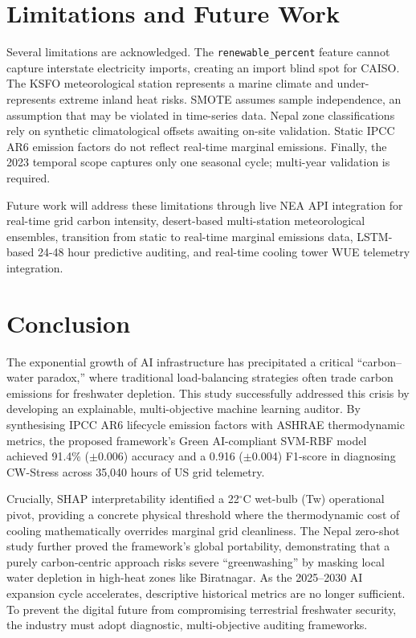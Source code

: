 \documentclass[conference]{IEEEtran}
\begin{document}
\section{Limitations and Future Work}
Several limitations are acknowledged. The \texttt{renewable\_percent} feature cannot capture interstate electricity imports, creating an import blind spot for CAISO. The KSFO meteorological station represents a marine climate and under-represents extreme inland heat risks. SMOTE assumes sample independence, an assumption that may be violated in time-series data. Nepal zone classifications rely on synthetic climatological offsets awaiting on-site validation. Static IPCC AR6 emission factors do not reflect real-time marginal emissions. Finally, the 2023 temporal scope captures only one seasonal cycle; multi-year validation is required.

Future work will address these limitations through live NEA API integration for real-time grid carbon intensity, desert-based multi-station meteorological ensembles, transition from static to real-time marginal emissions data, LSTM-based 24-48 hour predictive auditing, and real-time cooling tower WUE telemetry integration.

\section{Conclusion}
The exponential growth of AI infrastructure has precipitated a critical ``carbon–water paradox,'' where traditional load-balancing strategies often trade carbon emissions for freshwater depletion. This study successfully addressed this crisis by developing an explainable, multi-objective machine learning auditor. By synthesising IPCC AR6 lifecycle emission factors with ASHRAE thermodynamic metrics, the proposed framework's Green AI-compliant SVM-RBF model achieved 91.4\% ($\pm$0.006) accuracy and a 0.916 ($\pm$0.004) F1-score in diagnosing CW-Stress across 35,040 hours of US grid telemetry.

Crucially, SHAP interpretability identified a 22$^\circ$C wet-bulb (Tw) operational pivot, providing a concrete physical threshold where the thermodynamic cost of cooling mathematically overrides marginal grid cleanliness. The Nepal zero-shot study further proved the framework's global portability, demonstrating that a purely carbon-centric approach risks severe ``greenwashing'' by masking local water depletion in high-heat zones like Biratnagar. As the 2025–2030 AI expansion cycle accelerates, descriptive historical metrics are no longer sufficient. To prevent the digital future from compromising terrestrial freshwater security, the industry must adopt diagnostic, multi-objective auditing frameworks.
\end{document}
